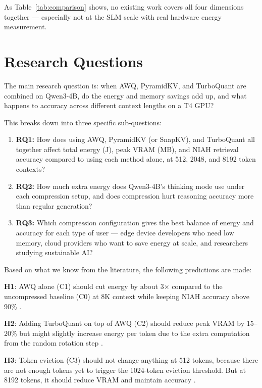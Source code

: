 \documentclass[conference]{IEEEtran}
\begin{document}
As Table~\ref{tab:comparison} shows, no existing work covers all four dimensions together --- especially not at the SLM scale with real hardware energy measurement.


\section{Research Questions}

The main research question is: when AWQ, PyramidKV, and TurboQuant are combined on \mbox{Qwen3-4B}, do the energy and memory savings add up, and what happens to accuracy across different context lengths on a T4 GPU?

This breaks down into three specific sub-questions:

\begin{enumerate}
\item \textbf{RQ1:} How does using AWQ, PyramidKV (or SnapKV), and TurboQuant all together affect total energy (J), peak VRAM (MB), and NIAH retrieval accuracy compared to using each method alone, at 512, 2048, and 8192 token contexts?

\item \textbf{RQ2:} How much extra energy does \mbox{Qwen3-4B}'s thinking mode use under each compression setup, and does compression hurt reasoning accuracy more than regular generation?

\item \textbf{RQ3:} Which compression configuration gives the best balance of energy and accuracy for each type of user --- edge device developers who need low memory, cloud providers who want to save energy at scale, and researchers studying sustainable AI?
\end{enumerate}

Based on what we know from the literature, the following predictions are made:

\textbf{H1}: AWQ alone (C1) should cut energy by about 3$\times$ compared to the uncompressed baseline (C0) at 8K context while keeping NIAH accuracy above 90\% \cite{awq}.

\textbf{H2}: Adding TurboQuant on top of AWQ (C2) should reduce peak VRAM by 15--20\% but might slightly increase energy per token due to the extra computation from the random rotation step \cite{turboquant}.

\textbf{H3}: Token eviction (C3) should not change anything at 512 tokens, because there are not enough tokens yet to trigger the 1024-token eviction threshold. But at 8192 tokens, it should reduce VRAM and maintain accuracy \cite{pyramidkv}.
\end{document}
